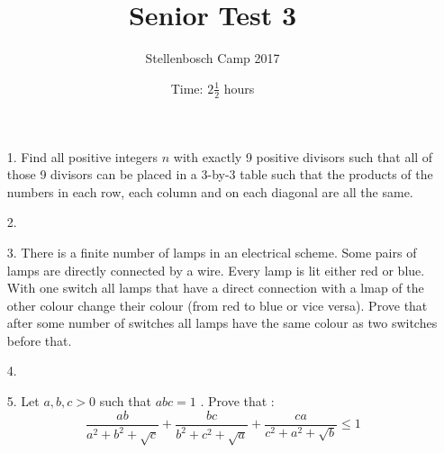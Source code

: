 \documentclass[12pt]{article}
\title{Senior Test 3}
\author{Stellenbosch Camp 2017}
\date{Time: $2\frac{1}{2}$ hours}
\begin{document}
 \maketitle

\begin{enumerate}

\item[1.] %
Find all positive integers $n$ with exactly 9 positive divisors such that all of those 9 divisors can be placed in a 3-by-3 table such that the products of the numbers in each row, each column and on each diagonal are all the same.


\item[2.] %


\item[3.] %
There is a finite number of lamps in an electrical scheme. Some pairs of lamps are directly connected by a wire. Every lamp is lit either red or blue. With one switch all lamps that have a direct connection with a lmap of the other colour change their colour (from red to blue or vice versa). Prove that after some number of switches all lamps have the same colour as two switches before that.


\item[4.] %


\item[5.] %
Let $ a,b,c > 0$ such that $ abc = 1$ . Prove that :
    $$ \frac {ab}{a^2 + b^2 + \sqrt {c}} + \frac {bc}{b^2 + c^2 + \sqrt {a}} + \frac {ca}{c^2 + a^2 + \sqrt {b}}\le 1 $$


\end{enumerate}
\end{document}

